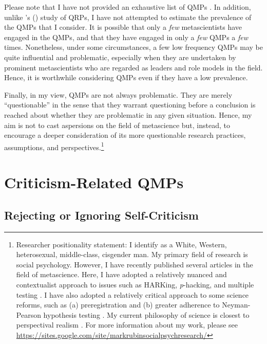 \documentclass[authordate, meta]{jote-new-article}
\begin{document}
Please note that I have not provided an exhaustive list of QMPs \parencites[for some additional QMPs, please see][p. 2]{Devezer2021}. In addition, unlike \citeauthor{John2012}'s \mbox{(\hspace*{-.21em}\citeyear{John2012})} study of QRPs, I have not attempted to estimate the prevalence of the QMPs that I consider. It is possible that only a \emph{few} metascientists have engaged in the QMPs, and that they have engaged in only a \emph{few} QMPs a \emph{few} times. Nonetheless, under some circumstances, a few low frequency QMPs may be quite influential and problematic, especially when they are undertaken by prominent metascientists who are regarded as leaders and role models in the field. Hence, it is worthwhile considering QMPs even if they have a low prevalence.



Finally, in my view, QMPs are not always problematic. They are merely “questionable” in the sense that they warrant questioning before a conclusion is reached about whether they are problematic in any given situation. Hence, my aim is not to cast aspersions on the field of metascience but, instead, to encourage a deeper consideration of its more questionable research practices, assumptions, and perspectives.\footnote{Researcher positionality statement: I identify as a White, Western, heterosexual, middle-class, cisgender man. My primary field of research is social psychology. However, I have recently published several articles in the field of metascience. Here, I have adopted a relatively nuanced and contextualist approach to issues such as HARKing, \emph{p}-hacking, and multiple testing \parencites[e.g.,][]{Rubin2017a}{Rubin2017b}{Rubin2021b}{Rubin2022}. I have also adopted a relatively critical approach to some science reforms, such as (a) preregistration \parencites[e.g.,][]{Rubin2020}{Rubin2022} and (b) greater adherence to Neyman-Pearson hypothesis testing \parencites[e.g.,][]{Rubin2021a}. My current philosophy of science is closest to perspectival realism \parencites{Crețu2019}{Giere2006}{Massimi2022}. For more information about my work, please see \url{https://sites.google.com/site/markrubinsocialpsychresearch/}}



\section{Criticism-Related QMPs}



\subsection{Rejecting or Ignoring Self-Criticism}
\end{document}
